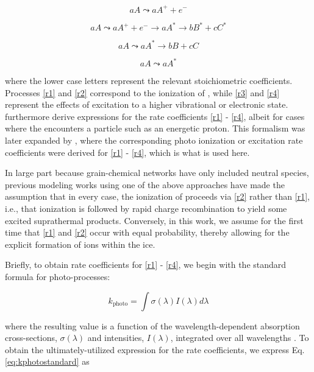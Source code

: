 \documentclass[journal=aesccq,manuscript=draft]{achemso}
\newcounter{ncounter}
\begin{document}
\begin{equation}
aA \leadsto{} aA^+ + e^-
\tag{R1}
\label{r1}
\end{equation}

\begin{equation}
aA \leadsto{} aA^+ + e^- \rightarrow{} aA^* \rightarrow{} bB^* + cC^*
\tag{R2}
\label{r2}
\end{equation}

\begin{equation}
aA \leadsto{} aA^* \rightarrow{} bB + cC
\tag{R3}
\label{r3}
\end{equation}

\begin{equation}
aA \leadsto{} aA^*
\tag{R4}
\label{r4}
\end{equation}

\noindent
where the lower case letters represent the relevant stoichiometric coefficients. Processes \eqref{r1} and \eqref{r2} correspond to the ionization of , while \eqref{r3} and \eqref{r4} represent the effects of excitation to a higher vibrational or electronic state. \citet{shingledecker_general_2018} furthermore derive expressions for the rate coefficients \eqref{r1} - \eqref{r4}, albeit for cases where the  encounters a particle such as an energetic proton. This formalism was later expanded by \citet{mullikin_new_2021}, where the corresponding photo ionization or excitation rate coefficients were derived for \eqref{r1} - \eqref{r4}, which is what is used here. 

In large part because grain-chemical networks have only included neutral species, previous modeling works using one of the above approaches have made the assumption that in every case, the ionization of  proceeds via \eqref{r2} rather than \eqref{r1}, i.e., that ionization is followed by rapid charge recombination to yield some excited suprathermal products. Conversely, in this work, we assume for the first time that \eqref{r1} and \eqref{r2} occur with equal probability, thereby allowing for the explicit formation of ions within the ice.

Briefly, to obtain rate coefficients for \eqref{r1} - \eqref{r4}, we begin with the standard formula for photo-processes:

\begin{equation}
    k_\mathrm{photo} = \int \sigma(\lambda)I(\lambda) d\lambda
    \label{eq:kphotostandard}
\end{equation}

\noindent  
where the resulting value is a function of the wavelength-dependent absorption cross-sections, $\sigma(\lambda)$ and intensities, $I(\lambda)$, integrated over all wavelengths \citep{van_dishoeck_photodissociation_1988}. To obtain the ultimately-utilized expression for the rate coefficients, we express Eq. \eqref{eq:kphotostandard} as
\end{document}
